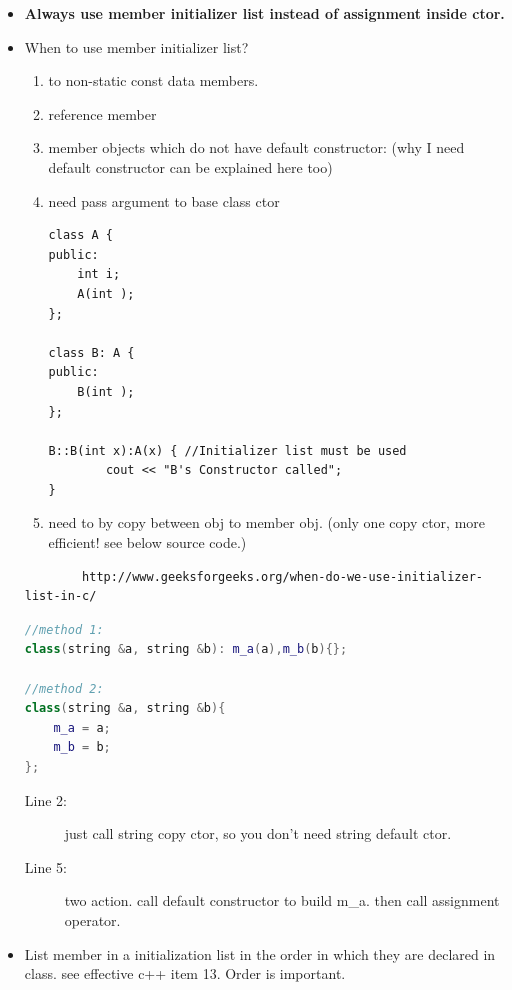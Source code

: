 \documentclass[a4paper,11pt,twoside]{book}
\begin{document}
\begin{itemize}
	\item \textbf{Always use member initializer list instead of assignment inside ctor.}
	
	\item When to use member initializer list?
	\begin{enumerate}
		\item to non-static const data members.
		\item reference member
		\item  member objects which do not have default constructor: (why I need default constructor can be explained here too)
		\item need pass argument to base class ctor
\begin{lstlisting}[numbers=none]
class A {
public:
	int i;
	A(int );
};
	
class B: A {
public:
	B(int );
};
	
B::B(int x):A(x) { //Initializer list must be used
		cout << "B's Constructor called";
}
\end{lstlisting}		
		
		\item need to by copy between obj to member obj. (only one copy ctor, more efficient! see below source code.)
	\end{enumerate}
	
	\begin{verbatim}
		http://www.geeksforgeeks.org/when-do-we-use-initializer-list-in-c/
	\end{verbatim}
	
\begin{lstlisting}[frame=single, language=c++]
//method 1:
class(string &a, string &b): m_a(a),m_b(b){};
		
//method 2:
class(string &a, string &b){   
	m_a = a;  
	m_b = b; 
};
\end{lstlisting}
	\begin{description}
		\item[Line 2:] just call string copy ctor, so you don't need string default ctor.
		\item[Line 5:] two action. call default constructor to build m\_a. then call assignment operator.
	\end{description}
	
	\item List member in a initialization list in the order in which they are declared in class. see effective c++ item 13. Order is important.
	

\end{itemize}
\end{document}
